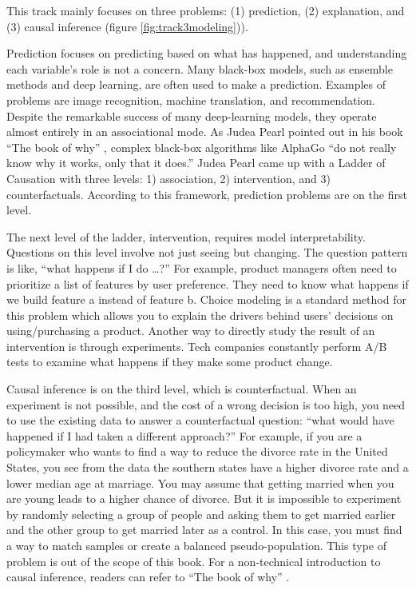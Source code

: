 \documentclass[
  12pt,
]{krantz}
\begin{document}
This track mainly focuses on three problems: (1) prediction, (2) explanation, and (3) causal inference (figure \ref{fig:track3modeling})).

Prediction focuses on predicting based on what has happened, and understanding each variable's role is not a concern. Many black-box models, such as ensemble methods and deep learning, are often used to make a prediction. Examples of problems are image recognition, machine translation, and recommendation. Despite the remarkable success of many deep-learning models, they operate almost entirely in an associational mode. As Judea Pearl pointed out in his book ``The book of why'' \citep{Judea2019}, complex black-box algorithms like AlphaGo ``do not really know why it works, only that it does.'' Judea Pearl came up with a Ladder of Causation \citep{Judea2019} with three levels: 1) association, 2) intervention, and 3) counterfactuals. According to this framework, prediction problems are on the first level.

The next level of the ladder, intervention, requires model interpretability. Questions on this level involve not just seeing but changing. The question pattern is like, ``what happens if I do \ldots?'' For example, product managers often need to prioritize a list of features by user preference. They need to know what happens if we build feature a instead of feature b. Choice modeling is a standard method for this problem which allows you to explain the drivers behind users' decisions on using/purchasing a product. Another way to directly study the result of an intervention is through experiments. Tech companies constantly perform A/B tests to examine what happens if they make some product change.

Causal inference is on the third level, which is counterfactual. When an experiment is not possible, and the cost of a wrong decision is too high, you need to use the existing data to answer a counterfactual question: ``what would have happened if I had taken a different approach?'' For example, if you are a policymaker who wants to find a way to reduce the divorce rate in the United States, you see from the data the southern states have a higher divorce rate and a lower median age at marriage. You may assume that getting married when you are young leads to a higher chance of divorce. But it is impossible to experiment by randomly selecting a group of people and asking them to get married earlier and the other group to get married later as a control. In this case, you must find a way to match samples or create a balanced pseudo-population. This type of problem is out of the scope of this book. For a non-technical introduction to causal inference, readers can refer to ``The book of why'' \citep{Judea2019}.
\end{document}
